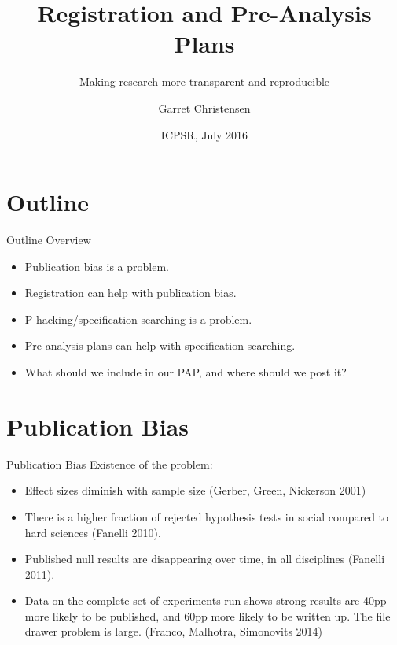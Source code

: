 \documentclass{beamer}
\title[Implementation: Registration and Pre-Analysis Plans] %
{Registration and Pre-Analysis Plans}
\subtitle
{Making research more transparent and reproducible}
\author[Garret Christensen] %
{Garret Christensen\inst{1}}
\institute[Universities of Somewhere and Elsewhere] %
{
  \inst{1}%
  University of California Berkeley\\
  Berkeley Initiative for Transparency in the Social Sciences\\
  and\\
  Berkeley Institute for Data Science
}
\date %
{ICPSR, July 2016}
\begin{document}
    
\begin{frame}
  \titlepage
\end{frame}



\section{Outline}

\begin{frame}[label=main]{Outline}
Overview
\begin{itemize}
\item
Publication bias is a problem.

\item
Registration can help with publication bias.
\item
P-hacking/specification searching is a problem.
\item
Pre-analysis plans can help with specification searching.
\item
What should we include in our PAP, and where should we post it?
\end{itemize}
\end{frame}
\section*{Publication Bias}
\begin{frame}{Publication Bias}%
  Existence of the problem:
  \begin{itemize}[<.->]
  \item
 Effect sizes diminish with sample size (Gerber, Green, Nickerson 2001)
  \item
  There is a higher fraction of rejected hypothesis tests in social compared to hard sciences (Fanelli 2010).
  \item
  	Published null results are disappearing over time, in all disciplines (Fanelli 2011). 
  \item
  	Data on the complete set of experiments run shows strong results are 40pp more likely to be published, and 60pp more likely to be written up. The file drawer problem is large. (Franco, Malhotra, Simonovits 2014)
  \end{itemize}
\end{frame}
\end{document}
